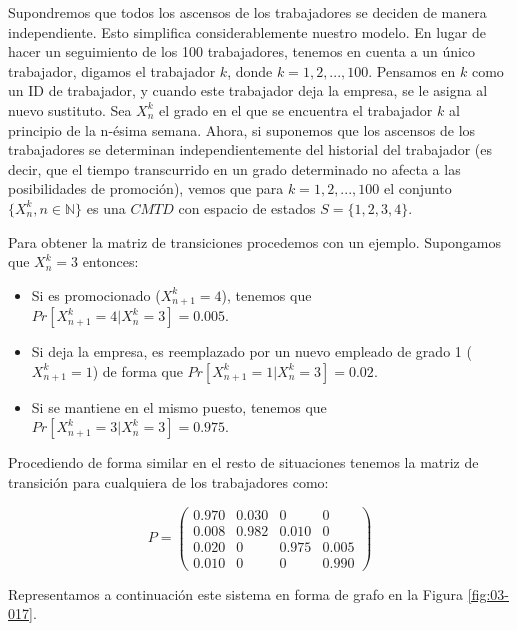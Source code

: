 \documentclass[
]{book}
\providecommand{\tightlist}{%
  \setlength{\itemsep}{0pt}\setlength{\parskip}{0pt}}
\theoremstyle{definition}
\theoremstyle{definition}
\theoremstyle{definition}
\theoremstyle{definition}
\theoremstyle{remark}
\begin{document}
Supondremos que todos los ascensos de los trabajadores se deciden de manera independiente. Esto simplifica considerablemente nuestro modelo. En lugar de hacer un seguimiento de los 100 trabajadores, tenemos en cuenta a un único trabajador, digamos el trabajador \(k\), donde \(k = 1, 2,...,100\). Pensamos en \(k\) como un ID de trabajador, y cuando este trabajador deja la empresa, se le asigna al nuevo sustituto. Sea \(X_n^k\) el grado en el que se encuentra el trabajador \(k\) al principio de la n-ésima semana. Ahora, si suponemos que los ascensos de los trabajadores se determinan independientemente del historial del trabajador (es decir, que el tiempo transcurrido en un grado determinado no afecta a las posibilidades de promoción), vemos que para \(k = 1, 2,...,100\) el conjunto \(\{X_n^k, n \in \mathbb{N}\}\) es una \(CMTD\) con espacio de estados \(S =\{1, 2, 3, 4\}\).

Para obtener la matriz de transiciones procedemos con un ejemplo. Supongamos que \(X_n^k = 3\) entonces:

\begin{itemize}
\tightlist
\item
  Si es promocionado (\(X_{n+1}^k = 4\)), tenemos que \(Pr[X_{n+1}^k = 4 | X_n^k = 3] = 0.005.\)
\item
  Si deja la empresa, es reemplazado por un nuevo empleado de grado 1 (\(X_{n+1}^k = 1\)) de forma que \(Pr[X_{n+1}^k = 1 | X_n^k = 3] = 0.02.\)
\item
  Si se mantiene en el mismo puesto, tenemos que \(Pr[X_{n+1}^k = 3 | X_n^k = 3] = 0.975.\)
\end{itemize}

Procediendo de forma similar en el resto de situaciones tenemos la matriz de transición para cualquiera de los trabajadores como:

\[P = 
\begin{pmatrix}
0.970 & 0.030 & 0 & 0\\
0.008 & 0.982 & 0.010 & 0\\
0.020 & 0 & 0.975 & 0.005\\
0.010 & 0 & 0 & 0.990
\end{pmatrix}\]

Representamos a continuación este sistema en forma de grafo en la Figura \ref{fig:03-017}.
\end{document}

